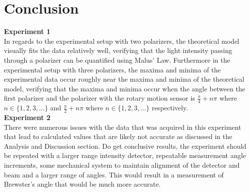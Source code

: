 \documentclass[
	letterpaper, %
	10pt, %
]{CSUniSchoolLabReport}
\begin{document}
\section{Conclusion}
\textbf{Experiment 1}\\
In regards to the experimental setup with two polarizers, the theoretical model visually fits the data relatively well,
verifying that the light intensity passing through a polarizer can be quantified using Malus' Law. Furthermore in the
experimental setup with three polarizers, the maxima and minima of the experimental data occur roughly near the maxima
and minima of the theoretical model, verifying that the maxima and minima occur when the angle between the first polarizer
and the polarizer with the rotary motion sensor is $\frac{\pi}{4} + n\pi$ where $n \in\{1, 2, 3, ...\}$ and
$\frac{\pi}{2}+n\pi$ where $n\in \{1, 2, 3, ...\}$ respectively.\\
\newpage
\textbf{Experiment 2}\\
There were numerous issues with the data that was acquired in this experiment that lead to calculated values that are
likely not accurate as discussed in the Analysis and Discussion section. Do get conclusive results, the experiment
should be repeated with a larger range intensity detector, repeatable measurement angle increments, some mechanical
system to maintain alignment of the detector and beam and a larger range of angles. This would result in a measurement
of Brewster's angle that would be much more accurate.
\end{document}
